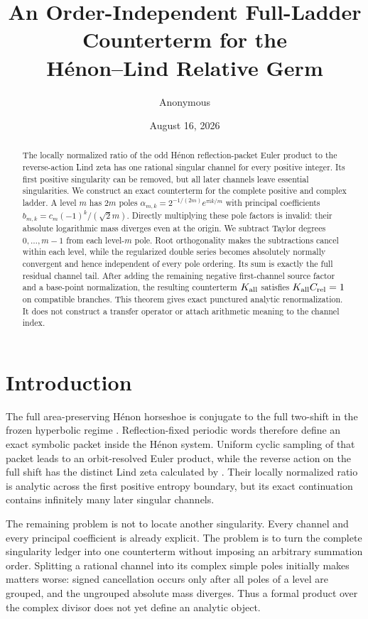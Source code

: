 \documentclass[11pt]{article}
\title{An Order-Independent Full-Ladder Counterterm for the\\H\'enon--Lind Relative Germ}
\author{Anonymous}
\date{August 16, 2026}
\newcommand{\Crel}{C_{\rm rel}}
\newcommand{\Kall}{K_{\rm all}}
\newcommand{\ii}{\mathrm i}
\begin{document}
\maketitle

\begin{abstract}
The locally normalized ratio of the odd H\'enon reflection-packet Euler
product to the reverse-action Lind zeta has one rational singular channel
for every positive integer.  Its first positive singularity can be removed,
but all later channels leave essential singularities.  We construct an exact
counterterm for the complete positive and complex ladder.  A level $m$ has
$2m$ poles
$\alpha_{m,k}=2^{-1/(2m)}e^{\pi\ii k/m}$ with principal coefficients
$b_{m,k}=c_m(-1)^k/(\sqrt2m)$.  Directly multiplying these pole factors is
invalid: their absolute logarithmic mass diverges even at the origin.  We
subtract Taylor degrees $0,\ldots,m-1$ from each level-$m$ pole.  Root
orthogonality makes the subtractions cancel within each level, while the
regularized double series becomes absolutely normally convergent and hence
independent of every pole ordering.  Its sum is exactly the full residual
channel tail.  After adding the remaining negative first-channel source
factor and a base-point normalization, the resulting counterterm
$\Kall$ satisfies $\Kall\Crel=1$ on compatible branches.  This theorem gives
exact punctured analytic renormalization.  It does not construct a transfer
operator or attach arithmetic meaning to the channel index.
\end{abstract}

\section{Introduction}

The full area-preserving H\'enon horseshoe is conjugate to the full two-shift
in the frozen hyperbolic regime \citep{DevaneyNitecki1979}.  Reflection-fixed
periodic words therefore define an exact symbolic packet inside the H\'enon
system.  Uniform cyclic sampling of that packet leads to an orbit-resolved
Euler product, while the reverse action on the full shift has the distinct
Lind zeta calculated by \citet{KimLeePark2003}.  Their locally normalized
ratio is analytic across the first positive entropy boundary, but its exact
continuation contains infinitely many later singular channels.

The remaining problem is not to locate another singularity.  Every channel
and every principal coefficient is already explicit.  The problem is to
turn the complete singularity ledger into one counterterm without imposing
an arbitrary summation order.  Splitting a rational channel into its complex
simple poles initially makes matters worse: signed cancellation occurs only
after all poles of a level are grouped, and the ungrouped absolute mass
diverges.  Thus a formal product over the complex divisor does not yet define
an analytic object.
\end{document}
